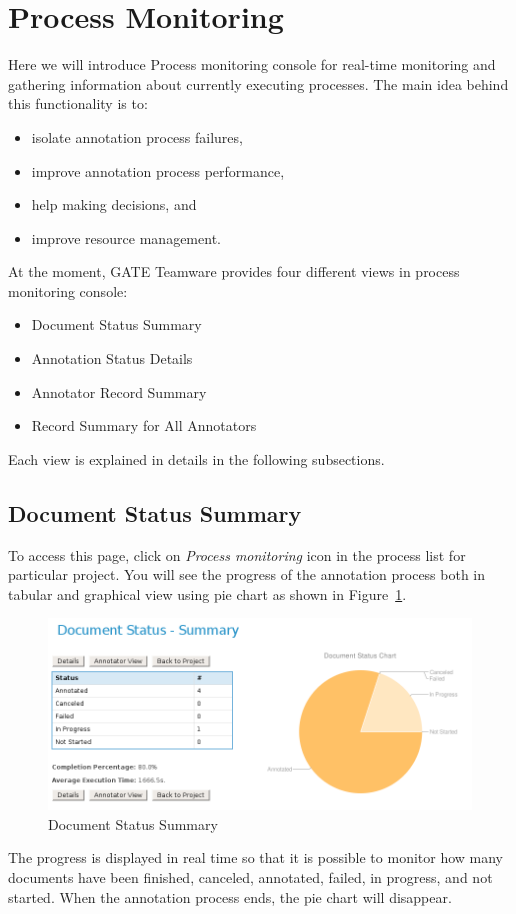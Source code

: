 \section{Process Monitoring}\label{section:process-monitoring}

Here we will introduce Process monitoring console for real-time
monitoring and gathering information about currently executing processes.
The main idea behind this functionality is to:
\begin{itemize}
  \item isolate annotation process failures,
  \item improve annotation process performance,
  \item help making decisions, and
  \item improve resource management.
\end{itemize}

At the moment, GATE Teamware provides four different views in process
monitoring console:
\begin{itemize}
  \item Document Status Summary
  \item Annotation Status Details
  \item Annotator Record Summary
  \item Record Summary for All Annotators
\end{itemize}

Each view is explained in details in the following subsections.

\subsection{Document Status Summary}
To access this page, click on \emph{Process monitoring} icon in the
process list for particular project. You will see the progress of the
annotation process both in tabular and graphical
view using pie chart as shown in Figure~\ref{fig:annotationstatusoverview}.
\begin{figure}[htb]
\centering
\includegraphics[scale=0.4]{annotationstatusoverview}
\caption{Document Status Summary}
\label{fig:annotationstatusoverview}
\end{figure}
The progress is displayed in real time so that it is possible
 to monitor how many documents have been finished, canceled, annotated, failed,
 in progress, and not started. When the annotation process ends, the pie chart
will disappear.

